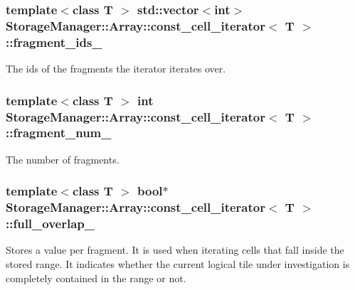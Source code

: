 \subsubsection[{fragment\+\_\+ids\+\_\+}]{\setlength{\rightskip}{0pt plus 5cm}template$<$class T $>$ std\+::vector$<$int$>$ {\bf Storage\+Manager\+::\+Array\+::const\+\_\+cell\+\_\+iterator}$<$ T $>$\+::fragment\+\_\+ids\+\_\+\hspace{0.3cm}{\ttfamily [private]}}\label{classStorageManager_1_1Array_1_1const__cell__iterator_a2cb5d8b4e215896fdd712bc7c263700a}
The ids of the fragments the iterator iterates over. \hypertarget{classStorageManager_1_1Array_1_1const__cell__iterator_a427240a3325532c64c2358b5bded512e}{}
\subsubsection[{fragment\+\_\+num\+\_\+}]{\setlength{\rightskip}{0pt plus 5cm}template$<$class T $>$ int {\bf Storage\+Manager\+::\+Array\+::const\+\_\+cell\+\_\+iterator}$<$ T $>$\+::fragment\+\_\+num\+\_\+\hspace{0.3cm}{\ttfamily [private]}}\label{classStorageManager_1_1Array_1_1const__cell__iterator_a427240a3325532c64c2358b5bded512e}
The number of fragments. \hypertarget{classStorageManager_1_1Array_1_1const__cell__iterator_a4cf4a6d25e09117726019623b8e752ba}{}
\subsubsection[{full\+\_\+overlap\+\_\+}]{\setlength{\rightskip}{0pt plus 5cm}template$<$class T $>$ bool$\ast$ {\bf Storage\+Manager\+::\+Array\+::const\+\_\+cell\+\_\+iterator}$<$ T $>$\+::full\+\_\+overlap\+\_\+\hspace{0.3cm}{\ttfamily [private]}}\label{classStorageManager_1_1Array_1_1const__cell__iterator_a4cf4a6d25e09117726019623b8e752ba}
Stores a value per fragment. It is used when iterating cells that fall inside the stored range. It indicates whether the current logical tile under investigation is completely contained in the range or not. \hypertarget{classStorageManager_1_1Array_1_1const__cell__iterator_aa43e8557cafb358276994ea6bbd89bd1}{}
